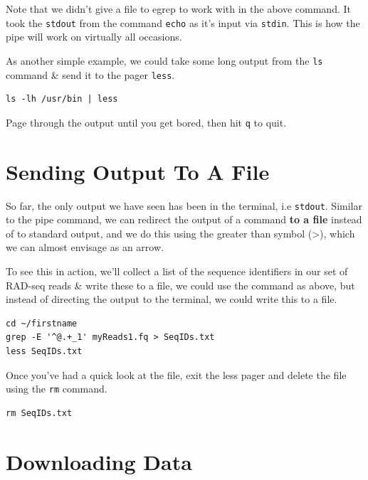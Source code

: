 \documentclass[a4paper,12pt,twoside]{memoir}
\begin{document}
\begin{information}
Note that we didn't give a file to egrep to work with in the above command.
It took the \texttt{stdout} from the command \texttt{echo} as it's input via \texttt{stdin}.
This is how the pipe will work on virtually all occasions.
\end{information}

\begin{steps}
As another simple example, we could take some long output from the \texttt{ls} command \& send it to the pager \texttt{less}.
\begin{lstlisting}
ls -lh /usr/bin | less
\end{lstlisting}
Page through the output until you get bored, then hit \texttt{q} to quit.
\end{steps}

\section{Sending Output To A File}
\begin{information}
So far, the only output we have seen has been in the terminal, i.e  \texttt{stdout}.
Similar to the pipe command, we can redirect the output of a command \textbf{to a file} instead of to standard output, and we do this using the greater than symbol (\textgreater), which we can almost envisage as an arrow.
\end{information}

\begin{steps}
To see this in action, we'll collect a list of the sequence identifiers in our set of RAD-seq reads \& write these to a file, we could use the command as above, but instead of directing the output to the terminal, we could write this to a file.
\end{steps}
\begin{lstlisting}
cd ~/firstname
grep -E '^@.+_1' myReads1.fq > SeqIDs.txt
less SeqIDs.txt
\end{lstlisting}

Once you've had a quick look at the file, exit the less pager and delete the file using the \texttt{rm} command.
\begin{lstlisting}
rm SeqIDs.txt
\end{lstlisting}

\section{Downloading Data}
\end{document}
